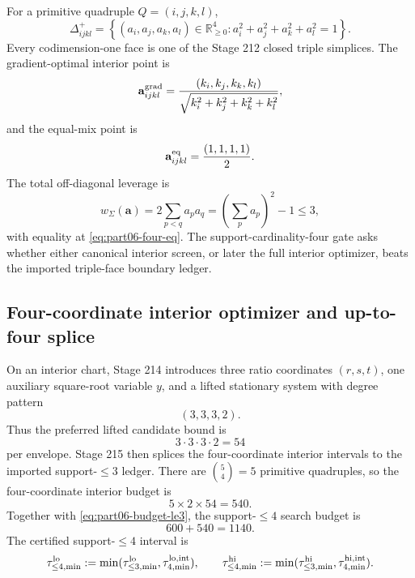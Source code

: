 For a primitive quadruple \(Q=(i,j,k,l)\),
\begin{equation}
\label{eq:part06-four-simplex}
\Delta_{ijkl}^{+}
=
\left\{(a_i,a_j,a_k,a_l)\in\mathbb R_{\ge0}^{4}:a_i^2+a_j^2+a_k^2+a_l^2=1\right\}.
\end{equation}
Every codimension-one face is one of the Stage 212 closed triple simplices.  The gradient-optimal interior point is
\begin{equation}
\label{eq:part06-four-grad}
\mathbf a_{ijkl}^{\rm grad}
=
\frac{(k_i,k_j,k_k,k_l)}{\sqrt{k_i^2+k_j^2+k_k^2+k_l^2}},
\end{equation}
and the equal-mix point is
\begin{equation}
\label{eq:part06-four-eq}
\mathbf a_{ijkl}^{\rm eq}=\frac{(1,1,1,1)}{2}.
\end{equation}
The total off-diagonal leverage is
\begin{equation}
\label{eq:part06-four-cross-leverage}
w_\Sigma(\mathbf a)=2\sum_{p<q}a_pa_q=\left(\sum_pa_p\right)^2-1\le3,
\end{equation}
with equality at \eqref{eq:part06-four-eq}.  The support-cardinality-four gate asks whether either canonical interior screen, or later the full interior optimizer, beats the imported triple-face boundary ledger.

\subsection{Four-coordinate interior optimizer and up-to-four splice}
\label{subsec:part06-four-interior-and-splice}

On an interior chart, Stage 214 introduces three ratio coordinates \((r,s,t)\), one auxiliary square-root variable \(y\), and a lifted stationary system with degree pattern
\begin{equation}
\label{eq:part06-four-degree-pattern}
(3,3,3,2).
\end{equation}
Thus the preferred lifted candidate bound is
\begin{equation}
\label{eq:part06-four-bezout}
3\cdot3\cdot3\cdot2=54
\end{equation}
per envelope.  Stage 215 then splices the four-coordinate interior intervals to the imported support-\(\le3\) ledger.  There are \(\binom54=5\) primitive quadruples, so the four-coordinate interior budget is
\begin{equation}
\label{eq:part06-four-budget}
5\times2\times54=540.
\end{equation}
Together with \eqref{eq:part06-budget-le3}, the support-\(\le4\) search budget is
\begin{equation}
\label{eq:part06-budget-le4}
600+540=1140.
\end{equation}
The certified support-\(\le4\) interval is
\begin{equation}
\label{eq:part06-le4-interval}
\tau_{\le4,\min}^{\rm lo}
:=\min(\tau_{\le3,\min}^{\rm lo},\tau_{4,\min}^{\rm lo,int}),
\qquad
\tau_{\le4,\min}^{\rm hi}
:=\min(\tau_{\le3,\min}^{\rm hi},\tau_{4,\min}^{\rm hi,int}).
\end{equation}

